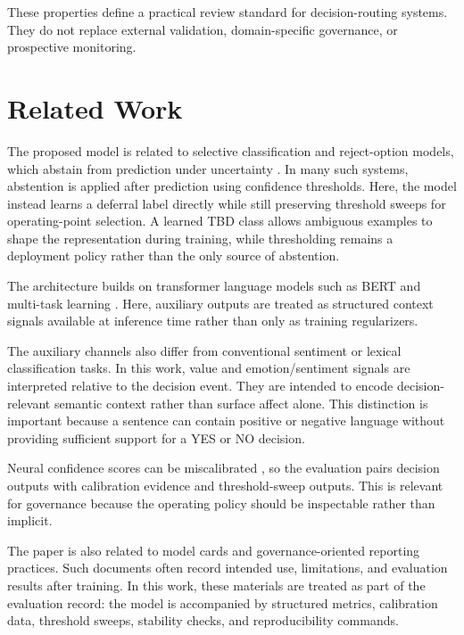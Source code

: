 \documentclass[11pt]{article}
\begin{document}
These properties define a practical review standard for decision-routing systems. They do not replace external validation, domain-specific governance, or prospective monitoring.

\section{Related Work}

The proposed model is related to selective classification and reject-option models, which abstain from prediction under uncertainty \cite{elyaniv2010selective, geifman2017selective, franc2023reject}. In many such systems, abstention is applied after prediction using confidence thresholds. Here, the model instead learns a deferral label directly while still preserving threshold sweeps for operating-point selection. A learned TBD class allows ambiguous examples to shape the representation during training, while thresholding remains a deployment policy rather than the only source of abstention.

The architecture builds on transformer language models such as BERT \cite{devlin2019bert} and multi-task learning \cite{caruana1997multitask}. Here, auxiliary outputs are treated as structured context signals available at inference time rather than only as training regularizers.

The auxiliary channels also differ from conventional sentiment or lexical classification tasks. In this work, value and emotion/sentiment signals are interpreted relative to the decision event. They are intended to encode decision-relevant semantic context rather than surface affect alone. This distinction is important because a sentence can contain positive or negative language without providing sufficient support for a YES or NO decision.

Neural confidence scores can be miscalibrated \cite{guo2017calibration}, so the evaluation pairs decision outputs with calibration evidence and threshold-sweep outputs. This is relevant for governance because the operating policy should be inspectable rather than implicit.

The paper is also related to model cards and governance-oriented reporting practices. Such documents often record intended use, limitations, and evaluation results after training. In this work, these materials are treated as part of the evaluation record: the model is accompanied by structured metrics, calibration data, threshold sweeps, stability checks, and reproducibility commands.
\end{document}
